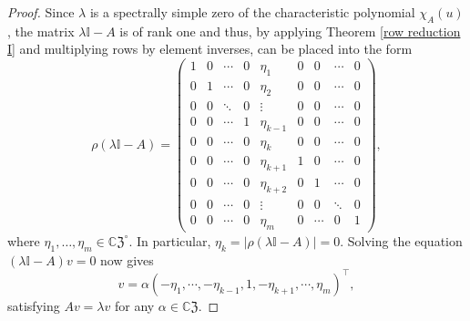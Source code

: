 \documentclass[10pt,a4paper]{amsart}
\newcommand{\CZ}{\mathbb{C}\mathfrak{Z}}
\newcommand{\mI}{\mathbb{I}}
\begin{document}
\begin{proof}
Since $\lambda$ is a spectrally simple zero of the characteristic polynomial $\chi_A(u)$, the matrix $\lambda\mI-A$ is of rank one and thus, by applying Theorem \ref{row reduction I} and multiplying rows by element inverses, can be placed into the form 
\begin{equation*}
\rho(\lambda\mI-A)=\begin{pmatrix}
1&0 &\cdots&0&{\eta_1}&0&0&\cdots&0\\
0&1& \cdots&0&{\eta_2}&0&0&\cdots&0\\
0&0&\ddots&0&\vdots&0&0&\cdots&0\\
0&0&\cdots&1&{\eta_{k-1}}&0&0&\cdots&0\\
0&0&\cdots&0&\eta_k&0&0&\cdots&0\\
0&0&\cdots&0&{\eta_{k+1}}&1&0&\cdots&0\\
0&0&\cdots&0&{\eta_{k+2}}&0&1&\cdots&0\\
0&0&\cdots&0&\vdots&0&0&\ddots&0\\
0&0&\cdots&0&{\eta_{m}}&0&\cdots&0&1
\end{pmatrix},
\end{equation*}
where $\eta_1, \ldots, \eta_m\in\CZ^\circ$.  In particular, $\eta_k=\vert\rho(\lambda\mI-A)\vert=0$.  Solving the equation $(\lambda\mI-A)v=0$ now gives \begin{equation*}
v=\alpha\left(-{\eta_1},\cdots,-{\eta_{k-1}},1,-{\eta_{k+1}},\cdots,{\eta_m}\right)^\intercal,
\end{equation*}
satisfying $Av=\lambda v$ for any $\alpha\in\CZ$.

\end{proof}
\end{document}
